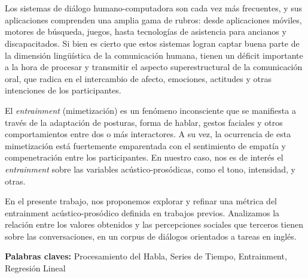 \chapter*{\runtitulo}

Los sistemas de diálogo humano-computadora son cada vez más frecuentes, y sus aplicaciones comprenden una amplia gama de rubros: desde aplicaciones móviles, motores de búsqueda, juegos, hasta tecnologías de asistencia para ancianos y discapacitados. Si bien es cierto que estos sistemas logran captar buena parte de la dimensión lingüística de la comunicación humana, tienen un déficit importante a la hora de procesar y transmitir el aspecto superestructural de la comunicación oral, que radica en el intercambio de afecto, emociones, actitudes y otras intenciones de los participantes.

El \emph{entrainment} (mimetización) es un fenómeno inconsciente que se manifiesta a través de la adaptación de posturas, forma de hablar, gestos faciales y otros comportamientos entre dos o más interactores. A su vez, la ocurrencia de esta mimetización está fuertemente emparentada con el sentimiento de empatía y compenetración entre los participantes. En nuestro caso, nos es de interés el \emph{entrainment} sobre las variables acústico-prosódicas, como el tono, intensidad, y otras.

En el presente trabajo, nos proponemos explorar y refinar una métrica del entrainment acústico-prosódico definida en trabajos previos. Analizamos la relación entre los valores obtenidos y las percepciones sociales que terceros tienen sobre las conversaciones, en un corpus de diálogos orientados a tareas en inglés.

\bigskip

\noindent\textbf{Palabras claves:} Procesamiento del Habla, Series de Tiempo, Entrainment, Regresión Lineal
